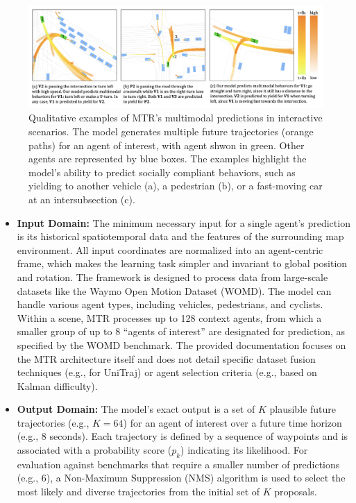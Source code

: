 \begin{figure}[htbp]
    \centering
    \includegraphics[width=\textwidth]{figures/input_output_viz.png}
    \caption{Qualitative examples of MTR's multimodal predictions in interactive scenarios. The model generates multiple future trajectories (orange paths) for an agent of interest, with agent shwon in green. Other agents are represented by blue boxes. The examples highlight the model's ability to predict socially compliant behaviors, such as yielding to another vehicle (a), a pedestrian (b), or a fast-moving car at an intersubsection (c).}
    \label{fig:input_output_example}
\end{figure}

\begin{itemize}
    \item \textbf{Input Domain:} The minimum necessary input for a single agent's prediction is its historical spatiotemporal data and the features of the surrounding map environment. All input coordinates are normalized into an agent-centric frame, which makes the learning task simpler and invariant to global position and rotation. The framework is designed to process data from large-scale datasets like the Waymo Open Motion Dataset (WOMD). The model can handle various agent types, including vehicles, pedestrians, and cyclists. Within a scene, MTR processes up to 128 context agents, from which a smaller group of up to 8 ``agents of interest'' are designated for prediction, as specified by the WOMD benchmark. The provided documentation focuses on the MTR architecture itself and does not detail specific dataset fusion techniques (e.g., for UniTraj) or agent selection criteria (e.g., based on Kalman difficulty).

    \item \textbf{Output Domain:} The model's exact output is a set of $K$ plausible future trajectories (e.g., $K=64$) for an agent of interest over a future time horizon (e.g., 8 seconds). Each trajectory is defined by a sequence of waypoints and is associated with a probability score ($p_k$) indicating its likelihood. For evaluation against benchmarks that require a smaller number of predictions (e.g., 6), a Non-Maximum Suppression (NMS) algorithm is used to select the most likely and diverse trajectories from the initial set of $K$ proposals.
\end{itemize}

